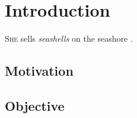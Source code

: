 \chapter{Introduction}

\textsc{She} sells \emph{seashells} on the seashore \cite{goodfellow2016}.

\section{Motivation}
\lipsum[1]

\section{Objective}
\lipsum[1]
